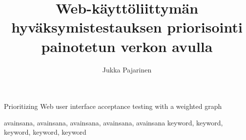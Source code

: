 \documentclass[finnish, authoryear]{config/tauthesis}
\theoremstyle{definition}
\begin{document}

\frontmatter


\title{Web-käyttöliittymän hyväksymistestauksen priorisointi painotetun verkon avulla}{Prioritizing Web user interface acceptance testing with a weighted graph}
\subtitle{}{}

\author{Jukka Pajarinen}




\keywords%
    {avainsana, avainsana, avainsana, avainsana, avainsana}
    {keyword, keyword, keyword, keyword, keyword}

\maketitle




\tableofcontents

\end{document}
